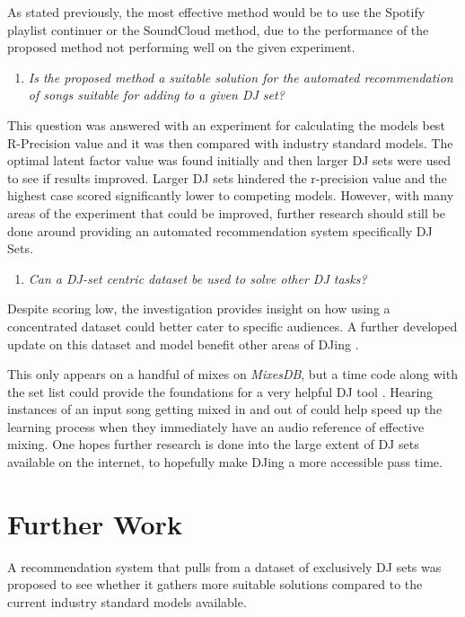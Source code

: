 As stated previously, the most effective method would be to use the Spotify playlist continuer or the SoundCloud method, due to the performance of the proposed method not performing well on the given experiment. 

\begin{enumerate}
	\item \textit{Is the proposed method a suitable solution for the automated recommendation of songs suitable for adding to a given DJ set?}
\end{enumerate}

This question was answered with an experiment for calculating the models best R-Precision value and it was then compared with industry standard models. The optimal latent factor value was found initially and then larger DJ sets were used to see if results improved. Larger DJ sets hindered the r-precision value and the highest case scored significantly lower to competing models. However, with many areas of the experiment that could be improved, further research should still be done  around providing an automated recommendation system specifically DJ Sets.

\begin{enumerate}
	\item \textit{Can a DJ-set centric dataset be used to solve other DJ tasks?}
\end{enumerate}

Despite scoring low, the investigation provides insight on how using a concentrated dataset could better cater to specific audiences. A further developed update on this dataset and model benefit other areas of DJing . 

This only appears on a handful of mixes on \textit{MixesDB}, but a time code along with the set list could provide the foundations for a very helpful DJ tool \citep{mixesdb_2015-01-02_2015}. Hearing instances of an input song getting mixed in and out of could help speed up the learning process when they immediately have an audio reference of effective mixing. One hopes further research is done into the large extent of DJ sets available on the internet, to hopefully make DJing a more accessible pass time. 

\section{Further Work}

A recommendation system that pulls from a dataset of exclusively DJ sets was proposed to see whether it gathers more suitable solutions compared to the current industry standard models available. 

